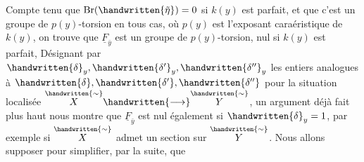 Compte tenu que $\mathrm{Br}(\handwritten{\tilde\eta})=0$ si $k(y)$ est parfait, et que c'est un groupe de $p(y)$-torsion en tous cas, où $p(y)$ est l'exposant caraéristique de $k(y)$, on trouve que $\underline F_{\bar y}$ est un groupe de $p(y)$-torsion, nul si $k(y)$ est parfait, Désignant par $\handwritten{\delta}_{y},\handwritten{\delta'}_{y},\handwritten{\delta''}_{y}$ les entiers analogues à $\handwritten{\delta},\handwritten{\delta'},\handwritten{\delta''}$ pour la situation localisée $\overset{\handwritten{\sim}}{X}\handwritten{\longrightarrow}\overset{\handwritten{\sim}}{Y}$, un argument déjà  fait plus haut nous montre que $\underline F_{\bar y}$  est nul également si $\handwritten{\delta}_{y}=1$, par exemple si $\overset{\handwritten{\sim}}{X}$ admet un section sur $\overset{\handwritten{\sim}}{Y}$. Nous allons supposer pour simplifier, par la suite, que
\clearpage
